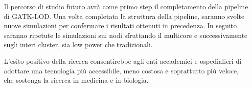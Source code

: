 Il percorso di studio futuro avrà come primo step il completamento della pipeline di GATK-LOD.
Una volta completata la struttura della pipeline, saranno svolte nuove simulazioni per confermare i risultati ottenuti in precedenza.
In seguito saranno ripetute le simulazioni sui nodi sfruttando il multicore e successivamente sugli interi cluster, sia low power che tradizionali.

L'esito positivo della ricerca consentirebbe agli enti accademici e ospedialieri di adottare una tecnologia più accessibile, meno costosa e soprattutto più veloce, che sostenga la ricerca in medicina e in biologia.


